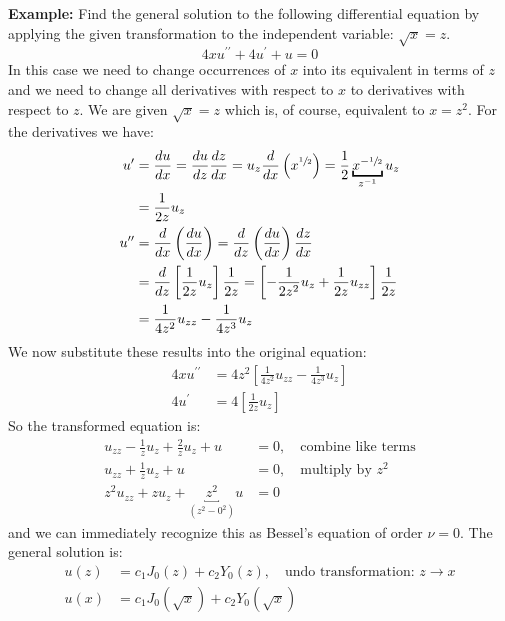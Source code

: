 \noindent\textbf{Example:} Find the general solution to the following differential equation by applying the given transformation to the independent variable: $\sqrt{x} = z$.
\begin{equation*}
4xu^{\prime \prime} + 4u^{\prime} + u = 0
\end{equation*}
In this case we need to change occurrences of $x$ into its equivalent in terms of $z$ and we need to change all derivatives with respect to $x$ to derivatives with respect to $z$.  We are given $\sqrt{x}=z$ which is, of course, equivalent to $x = z^2$.  For the derivatives we have:
\begin{align*}
u^{\prime} &= \frac{du}{dx} = \frac{du}{dz}\frac{dz}{dx} = u_z\frac{d}{dx}\left(x^{\sfrac{1}{2}}\right) = \frac{1}{2}\underbracket{x^{-\sfrac{1}{2}}}_{z^{-1}}u_z  \\
&=\frac{1}{2z}u_z \\
u^{\prime \prime} &= \frac{d}{dx}\left(\frac{du}{dx} \right) = \frac{d}{dz}\left(\frac{du}{dx}\right)\frac{dz}{dx} \\
&=\frac{d}{dz}\left[\frac{1}{2z}u_z\right]\frac{1}{2z} = \left[-\frac{1}{2z^2}u_z + \frac{1}{2z}u_{zz} \right] \frac{1}{2z} \\
&=\frac{1}{4z^2}u_{zz}-\frac{1}{4z^3}u_z
\end{align*}
We now substitute these results into the original equation:
\begin{align*}
4xu^{\prime \prime} &= 4z^2\left[\frac{1}{4z^2}u_{zz}-\frac{1}{4z^3}u_z \right] \\
4u^{\prime} &= 4\left[\frac{1}{2z}u_z\right]
\end{align*}
So the transformed equation is:
\begin{align*}
u_{zz}-\frac{1}{z}u_z + \frac{2}{z}u_z + u &= 0, \ \ \ \text{ combine like terms}\\
u_{zz} + \frac{1}{z}u_z + u &= 0, \ \ \ \text{ multiply by }z^2 \\
z^2u_{zz} + zu_{z} + \underbracket{z^2}_{\left(z^2-0^2\right)}u &= 0
\end{align*}
and we can immediately recognize this as Bessel's equation of order $\nu = 0$. The general solution is:
\begin{align*}
u(z) &= c_1J_0(z) + c_2Y_0(z), \ \ \ \text{ undo transformation: }z\to x \\
u(x) &= c_1J_0(\sqrt{x}) + c_2Y_0(\sqrt{x})
\end{align*}

